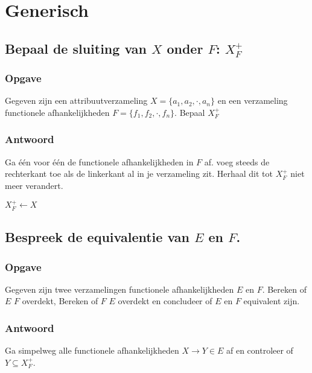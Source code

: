 \documentclass[normaalvormen.tex]{subfiles}
\begin{document}
\chapter{Generisch}
\renewcommand\thesection{Vraag \arabic{section}}
\renewcommand\thesubsection{V\arabic{section}}

\section{Bepaal de sluiting van $X$ onder $F$: $X_{F}^{+}$}
\subsection{Opgave}
Gegeven zijn een attribuutverzameling $X = \{a_1,a_2,\cdot,a_n\}$ en een verzameling functionele afhankelijkheden $F=  \{f_1,f_2,\cdot,f_n\}$. Bepaal $X_{F}^{+}$
\subsection{Antwoord}
Ga \'e\'en voor \'e\'en de functionele afhankelijkheden in $F$ af. voeg steeds de rechterkant toe als de linkerkant al in je verzameling zit. Herhaal dit tot $X_{F}^{+}$ niet meer verandert.
\begin{mdframed}
\begin{algorithm}[H]
$X_{F}^{+} \leftarrow X$\\
\end{algorithm}
\end{mdframed}


\section{Bespreek de equivalentie van $E$ en $F$.}
\subsection{Opgave}
Gegeven zijn twee verzamelingen functionele afhankelijkheden $E$ en $F$. Bereken of $E$ $F$ overdekt, Bereken of $F$ $E$ overdekt en concludeer of $E$ en $F$ equivalent zijn.
\subsection{Antwoord}
Ga simpelweg alle functionele afhankelijkheden $X\rightarrow Y \in E$ af en controleer of $Y \subseteq X_{F}^{+}$.
\begin{mdframed}
\begin{algorithm}[H]
\end{algorithm}
\end{mdframed}
\end{document}
